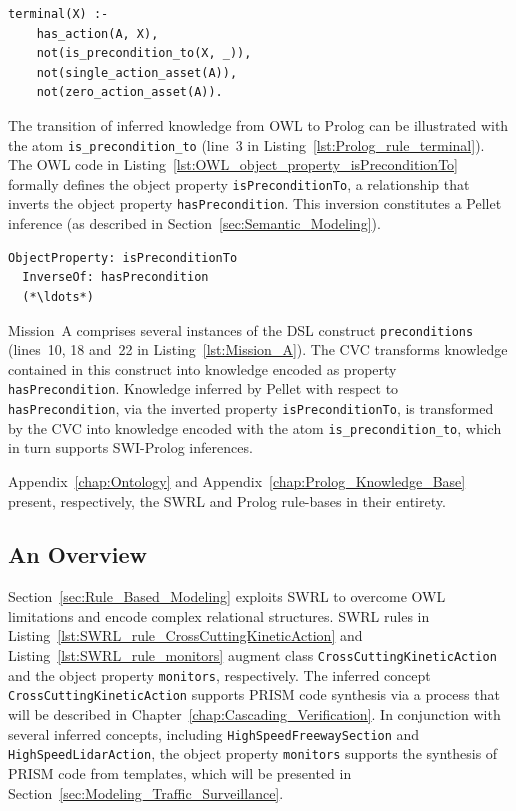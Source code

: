\begin{lstlisting}[caption={Prolog code for rule \texttt{terminal}},label=lst:Prolog_rule_terminal]
terminal(X) :-
    has_action(A, X),
    not(is_precondition_to(X, _)),
    not(single_action_asset(A)),
    not(zero_action_asset(A)).
\end{lstlisting}

The transition of inferred knowledge from OWL to Prolog can be illustrated with the atom \texttt{is\_precondition\_to} (line~3 in Listing~\ref{lst:Prolog_rule_terminal}). The OWL code in Listing~\ref{lst:OWL_object_property_isPreconditionTo} formally defines the object property \texttt{isPreconditionTo}, a relationship that inverts the object property \texttt{hasPrecondition}. This inversion constitutes a Pellet inference (as described in Section~\ref{sec:Semantic_Modeling}).

\begin{lstlisting}[caption={OWL code for the object property \texttt{isPreconditionTo}},label=lst:OWL_object_property_isPreconditionTo]
ObjectProperty: isPreconditionTo
  InverseOf: hasPrecondition
  (*\ldots*)
\end{lstlisting}

Mission~A comprises several instances of the DSL construct \texttt{preconditions} (lines~10, 18 and~22 in Listing~\ref{lst:Mission_A}). The CVC transforms knowledge contained in this construct into knowledge encoded as property \texttt{hasPrecondition}. Knowledge inferred by Pellet with respect to \texttt{hasPrecondition}, via the inverted property \texttt{isPreconditionTo}, is transformed by the CVC into knowledge encoded with the atom \texttt{is\_precondition\_to}, which in turn supports SWI-Prolog inferences.

Appendix~\ref{chap:Ontology} and Appendix~\ref{chap:Prolog_Knowledge_Base} present, respectively, the SWRL and Prolog rule-bases in their entirety.

\subsection{An Overview}

Section~\ref{sec:Rule_Based_Modeling} exploits SWRL to overcome OWL limitations and encode complex relational structures. SWRL rules in Listing~\ref{lst:SWRL_rule_CrossCuttingKineticAction} and Listing~\ref{lst:SWRL_rule_monitors} augment class \texttt{CrossCutting\-KineticAction} and the object property \texttt{monitors}, respectively. The inferred concept \texttt{CrossCuttingKineticAction} supports PRISM code synthesis via a process that will be described in Chapter~\ref{chap:Cascading_Verification}. In conjunction with several inferred concepts, including \texttt{HighSpeedFreewaySection} and \texttt{HighSpeedLidarAction}, the object property \texttt{monitors} supports the synthesis of PRISM code from templates, which will be presented in Section~\ref{sec:Modeling_Traffic_Surveillance}.

